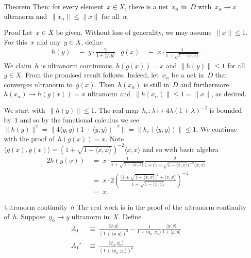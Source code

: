 \documentclass[b]{subfiles}
\begin{document}
\begin{parsec}
\begin{point}{Theorem}
Then: for every element~$x \in X$,
    there is a net~$x_\alpha$ in~$D$
    with~$x_\alpha \to x$ ultranorm
    and~$\|x_\alpha\| \leq \|x\|$ for all~$\alpha$.
\begin{point}{Proof}%
Let~$x \in X$ be given.
Without loss of generality, we may assume~$\| x \| \leq 1$.
For this~$x$ and any~$y \in X$, define
\begin{align*}
    h(y) &\ \equiv \ y \cdot\frac{2}{1+ \langle y, y \rangle}
    &
    g(x) &\ \equiv \ x \cdot\frac{1}{1+ \sqrt{1- \langle x, x\rangle}}.
\end{align*}
We claim~$h$ is ultranorm continuous,
$h(g(x)) = x$ and $\| h(y) \| \leq 1$ for all~$y \in X$.
From the promised result follows.
Indeed, let~$x_\alpha$ be a net in~$D$
    that converges ultranorm to~$g(x)$.
Then~$h(x_\alpha)$ is
    still in~$D$
    and furthermore~$h(x_\alpha) \to h(g(x)) = x$ ultranorm
    and~$\| h(x_\alpha) \| \leq 1 = \| x \|$, as desired.
\begin{point}%
We start with~$\| h(y) \| \leq 1$.
The real map~$h_r\colon \lambda \mapsto 4 \lambda (1+\lambda)^{-2}$
    is bounded by~$1$ and so by the functional calculus
    we see~$\| h(y) \|^2 = \| 4 \langle y,y\rangle (1+ \langle y,y\rangle)^{-2} \|
                = \| h_r(\langle y,y\rangle) \|  \leq 1$.
We continue with the proof of~$h(g(x)) = x$.
Note~$\langle g(x), g(x) \rangle
= (1 + \sqrt{1 - \langle x,x \rangle })^{-2} \langle x,x\rangle$
and so with basic algebra
\begin{alignat*}{2}
    h(g(x)) &\ = \ x \cdot
\frac{1}{ 1 + \sqrt{1 - \langle x,x\rangle }}
\frac{2}{1 + \bigl(1 + \sqrt{1 - \langle x,x \rangle }\bigr)^{-2} \langle x,x\rangle} \\
& \ =\  x \cdot 2 \left( \frac{
    \bigl(1 + \sqrt{1-\langle x, x\rangle}\bigr)^2 + \langle x,x \rangle
}{1 + \sqrt{1 - \langle x,x \rangle}} \right)^{-1} \\
& \ = \ x.
\end{alignat*}
\end{point}
\begin{point}{Ultranorm continuity~$h$}%
The real work is in the proof of the ultranorm continuity of~$h$.
Suppose~$y_\alpha \to y$ ultranorm in~$X$. Define
\begin{align*}
    A_1 & \ \equiv \ \frac{\langle y,y\rangle}{(1 + \langle y,y \rangle)^2} 
            - \frac{1}{1+\langle y_\alpha,y_\alpha \rangle} \frac{\langle y,y \rangle}{1+\langle y,y \rangle} \\
    A_1' & \ \equiv \ 
    \frac{\langle y_\alpha,y_\alpha\rangle}{(1 + \langle y_\alpha,y_\alpha \rangle)^2}  

\end{align*}
\end{point}
\end{point}
\end{point}
\end{parsec}
\end{document}
